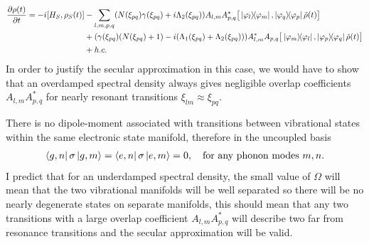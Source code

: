 \documentclass[]{article}
\begin{document}
\begin{itemize}
\begin{itemize}
\begin{align}
	\label{eq:VibronicNonSecular1}
	\begin{split}
		\pdv{\rho(t)}{t} = -i[H_S, \rho_S(t)] &- \sum_{l,m,p,q}  (N(\xi_{pq})\gamma(\xi_{pq})+i\Lambda_2(\xi_{pq})) A_{l,m}A_{p,q}^{*}\big[\dyad{\varphi_l}{\varphi_m}, \dyad{\varphi_q}{\varphi_p}\tilde{\rho}(t)\big] \\
		&+ (\gamma(\xi_{pq})(N(\xi_{pq})+1)-i(\Lambda_1(\xi_{pq})+\Lambda_2(\xi_{pq})))  A_{l,m}^{*}A_{p,q}\big[\dyad{\varphi_m}{\varphi_l}, \dyad{\varphi_p}{\varphi_q}\tilde{\rho}(t)\big]\\ &+ h.c.
	\end{split}
\end{align}
In order to justify the secular approximation in this case, we would have to show that an overdamped spectral density always gives negligible overlap coefficients $A_{l,m}A_{p,q}^{*}$ for nearly resonant transitions $\xi_{lm}\approx \xi_{pq}$.

There is no dipole-moment associated with transitions between vibrational states within the same electronic state manifold, therefore in the uncoupled basis
\begin{align}
	\begin{split}
		\bra{g,n}\sigma\ket{g,m} = \bra{e,n}\sigma\ket{e,m} = 0, \quad \textnormal{for any phonon modes } m,n.
	\end{split}
\end{align}
I predict that for an underdamped spectral density, the small value of $\Omega$ will mean that the two vibrational manifolds will be well separated so there will be no nearly degenerate states on separate manifolds, this should mean that any two transitions with a large overlap coefficient $A_{l,m}A_{p,q}^{*}$ will describe two far from resonance transitions and the secular approximation will be valid.


\end{itemize}
\end{itemize}
\end{document}
